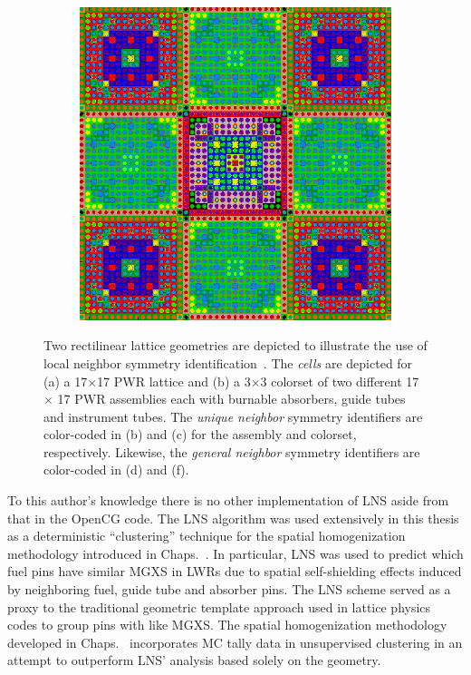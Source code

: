 \begin{figure}[h!]
\begin{subfigure}{.5\textwidth}
  \caption{}
  \label{fig:assm-neighbors}
\end{subfigure}
\begin{subfigure}{.5\textwidth}
  \centering
  \includegraphics[width=.7\linewidth]{figures/workflow/opencg/neighbor-cells-xy-colorset}
  \caption{}
  \label{fig:colorset-neighbors}
\end{subfigure}
\caption[Example OpenCG Local Neighbor Symmetry mappings]{Two rectilinear lattice geometries are depicted to illustrate the use of local neighbor symmetry identification~\cite{boyd2015opencg}. The \textit{cells} are depicted for (a) a 17$\times$17 PWR lattice and (b) a 3$\times$3 colorset of two different 17 $\times$ 17 PWR assemblies each with burnable absorbers, guide tubes and instrument tubes. The \textit{unique neighbor} symmetry identifiers are color-coded in (b) and (c) for the assembly and colorset, respectively. Likewise, the \textit{general neighbor} symmetry identifiers are color-coded in (d) and (f).}
\label{fig:neighbor-cells}
\end{figure}

To this author's knowledge there is no other implementation of \ac{LNS} aside from that in the OpenCG code. The \ac{LNS} algorithm was used extensively in this thesis as a deterministic ``clustering'' technique for the spatial homogenization methodology introduced in Chaps.~. In particular, \ac{LNS} was used to predict which fuel pins have similar \ac{MGXS} in \ac{LWRs} due to spatial self-shielding effects induced by neighboring fuel, guide tube and absorber pins. The \ac{LNS} scheme served as a proxy to the traditional geometric template approach used in lattice physics codes to group pins with like \ac{MGXS}. The spatial homogenization methodology developed in Chaps.~ incorporates \ac{MC} tally data in unsupervised clustering in an attempt to outperform \ac{LNS}' analysis based solely on the geometry.


